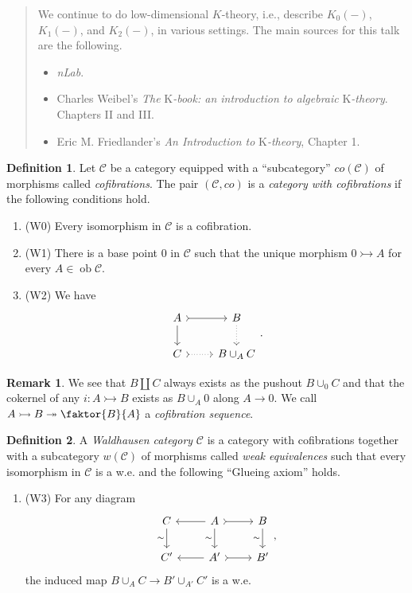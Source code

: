 \documentclass[10pt,letterpaper,cm]{nupset}
\theoremstyle{definition}
\newtheorem*{definition}{Definition}
\newtheorem{remark}{Remark}
\newcommand{\1}{\mathbf{1}}
\renewcommand{\c}{\mathscr{C}}
\newcommand{\0}{\vec 0}
\DeclareMathOperator{\ob}{ob}
\begin{document}
\begin{abstract}
We continue to do low-dimensional $K$-theory, i.e., describe $K_0(-)$, $K_1(-)$, and $K_2(-)$, in various settings. The main sources for this talk are the following.
\begin{itemize}
\item \textit{nLab}.
\item Charles Weibel's \textit{The} K\textit{-book: an introduction to algebraic} K\textit{-theory}. Chapters II and III.
\item Eric M. Friedlander's \textit{An Introduction to} K\textit{-theory}, Chapter 1.
\end{itemize}
\end{abstract}


\begin{definition}
Let $\c$ be a category equipped with a ``subcategory'' $co(\c)$ of morphisms called \textit{cofibrations}. The pair $(\c, co)$ is a \textit{category with cofibrations} if the following conditions hold.
\begin{enumerate}
\item (W0) Every isomorphism in $\c$ is a cofibration.
\item (W1) There is a base point $0$ in $\c$ such that the unique morphism $0 \rightarrowtail A$ for every $A \in \ob \c$.
\item (W2) We have
\[
\begin{tikzcd}
A \arrow[d] \arrow[r, tail] & B \arrow[d, dotted] \\
C \arrow[r, dotted, tail] & B \cup_A C
\end{tikzcd}.
\]
\end{enumerate}
\end{definition}

\begin{remark}
We see that $B \coprod C$ always exists as the pushout $B \cup_0 C$ and that the cokernel of any $i : A \rightarrowtail B$ exists as $B \cup_A 0$ along $A \to 0$. We call $A \rightarrowtail  B \twoheadrightarrow \faktor{B}{A}$ a \textit{cofibration sequence}.
\end{remark}

\begin{definition}
A \textit{Waldhausen category} $\c$ is a category with cofibrations together with a subcategory $w(\c)$ of morphisms called \textit{weak equivalences} such that every isomorphism in $\c$ is a w.e. and the following ``Glueing axiom'' holds.
\begin{enumerate}
\item (W3) For any diagram
\[
\begin{tikzcd}
C \arrow[d, "\sim"'] & A \arrow[d, "\sim"'] \arrow[r, tail] \arrow[l] & B \arrow[d, "\sim"'] \\
C' & A' \arrow[r, tail] \arrow[l] & B'
\end{tikzcd}, \]
the induced map $B \cup_A C \to  B' \cup_{A'} C'$ is a w.e.
\end{enumerate}
\end{definition}
\end{document}
